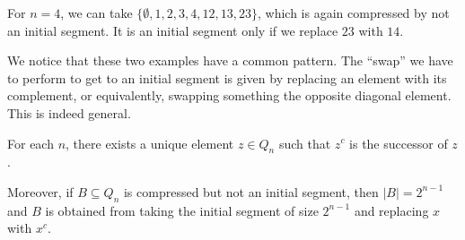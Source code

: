 \documentclass[a4paper]{article}
\begin{document}
For $n = 4$, we can take $\{\emptyset, 1, 2, 3, 4, 12, 13, 23\}$, which is again compressed by not an initial segment. It is an initial segment only if we replace $23$ with $14$.
\begin{center}
\end{center}
We notice that these two examples have a common pattern. The ``swap'' we have to perform to get to an initial segment is given by replacing an element with its complement, or equivalently, swapping something the opposite diagonal element. This is indeed general. 
\begin{lemma}
  For each $n$, there exists a unique element $z \in Q_n$ such that $z^c$ is the successor of $z$.

  Moreover, if $B \subseteq Q_n$ is compressed but not an initial segment, then $|B| = 2^{n - 1}$ and $B$ is obtained from taking the initial segment of size $2^{n - 1}$ and replacing $x$ with $x^c$.
\end{lemma}
\end{document}
